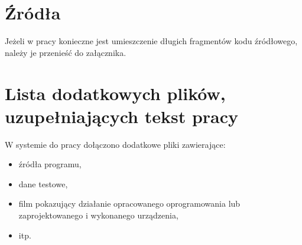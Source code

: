 \documentclass[a4paper,twoside,12pt]{book}
\newcommand{\obcy}[1]{\emph{#1}}
\newcommand{\ang}[1]{{\selectlanguage{british}\obcy{#1}}}
\begin{document}



 



\begin{appendices}
 




\chapter*{Źródła}

Jeżeli w pracy konieczne jest umieszczenie długich fragmentów kodu źródłowego, należy je przenieść do załącznika.

 
\chapter*{Lista dodatkowych plików, uzupełniających tekst pracy}

W systemie do pracy dołączono dodatkowe pliki zawierające:
\begin{itemize}
\item źródła programu,
\item dane testowe,
\item film pokazujący działanie opracowanego oprogramowania lub zaprojektowanego i wykonanego urządzenia,
\item itp.
\end{itemize}

\listoffigures
{}
\listoftables
{}
	
\end{appendices}
\end{document}
